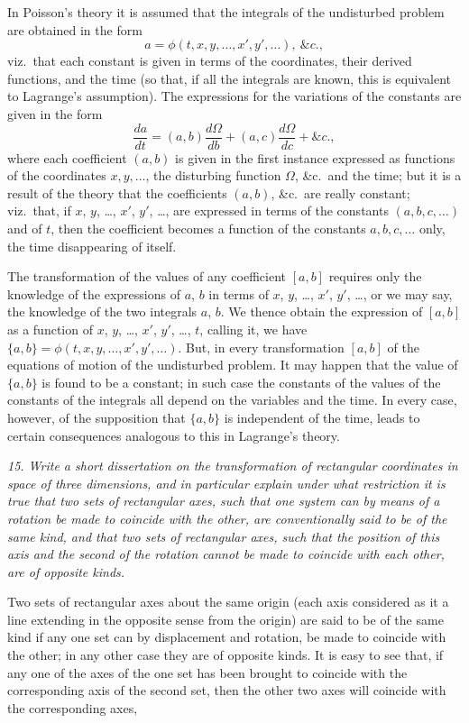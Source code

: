 \documentclass[11pt,a4paper]{article}
\theoremstyle{plain}
\theoremstyle{definition}
\begin{document}
In Poisson's theory it is assumed that the integrals of the undisturbed problem
are obtained in the form
\[
a = \phi(t, x, y, \ldots, x', y', \ldots),\ \&c.,
\]
viz.\ that each constant is given in terms of the coordinates, their derived functions,
and the time (so that, if all the integrals are known, this is equivalent to Lagrange's
assumption). The expressions for the variations of the constants are given in the form
\[
\frac{da}{dt} = (a, b)\frac{d\Omega}{db} + (a, c)\frac{d\Omega}{dc} + \&c.,
\]
where each coefficient $(a, b)$ is given in the first instance expressed as functions of the coordinates
$x, y, \ldots$, the disturbing function $\Omega$, \&c.\ and the time; but it is a result of the theory
that the coefficients $(a, b)$, \&c.\ are really constant; viz.\ that, if $x$, $y$, \ldots, $x'$, $y'$, \ldots, are
expressed in terms of the constants $(a, b, c, \ldots)$ and of $t$, then the coefficient becomes a function of the constants $a, b, c, \ldots$ only, the time disappearing of itself.

The transformation of the values of any coefficient $[a, b]$ requires only the knowledge of
the expressions of $a$, $b$ in terms of $x$, $y$, \ldots, $x'$, $y'$, \ldots, or we may say, the knowledge of the two
integrals $a$, $b$. We thence obtain the expression of $[a, b]$ as a function of $x$, $y$, \ldots, $x'$, $y'$, \ldots,
$t$, calling it, we have $\{a, b\} = \phi(t, x, y, \ldots, x', y', \ldots)$. But, in every transformation $[a, b]$ of the
equations of motion of the undisturbed problem. It may happen that the value of
$\{a, b\}$ is found to be a constant; in such case the constants of the values of the constants
of the integrals all depend on the variables and the time. In every case, however,
of the supposition that $\{a, b\}$ is independent of the time, leads to certain consequences
analogous to this in Lagrange's theory.

\textit{15. Write a short dissertation on the transformation of rectangular coordinates in
space of three dimensions, and in particular explain under what restriction it is true
that two sets of rectangular axes, such that one system can by means of a rotation be
made to coincide with the other, are conventionally said to be of the same kind, and that
two sets of rectangular axes, such that the position of this axis and the second of the
rotation cannot be made to coincide with each other, are of opposite kinds.}

Two sets of rectangular axes about the same origin (each axis considered as it
a line extending in the opposite sense from the origin) are said to be of the same
kind if any one set can by displacement and rotation, be made to coincide with the
other; in any other case they are of opposite kinds. It is easy to see that, if any one
of the axes of the one set has been brought to coincide with the corresponding axis
of the second set, then the other two axes will coincide with the corresponding axes,
\end{document}
